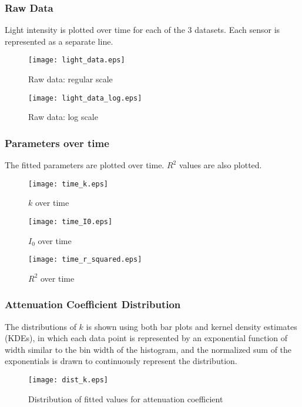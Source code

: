 \subsubsection{Raw Data}

Light intensity is plotted over time for each of the 3 datasets. Each sensor is represented as a separate line.

\begin{figure}[H]
	\centering
	\texttt{[image: light\_data.eps]}
	\caption{Raw data: regular scale}
\end{figure}

\begin{figure}[H]
	\centering
	\texttt{[image: light\_data\_log.eps]}
	\caption{Raw data: log scale}
\end{figure}

\pagebreak
\subsubsection{Parameters over time}
The fitted parameters are plotted over time. $R^2$ values are also plotted.

\begin{figure}[H]
	\centering
	\texttt{[image: time\_k.eps]}
	\caption{$k$ over time}
	\label{time_k}
\end{figure}

\begin{figure}[H]
	\centering
	\texttt{[image: time\_I0.eps]}
	\caption{$I_0$ over time}
	\label{time_I0}
\end{figure}

\begin{figure}[H]
	\centering
	\texttt{[image: time\_r\_squared.eps]}
	\caption{$R^2$ over time}
	\label{time_r_squared}
\end{figure}

\subsubsection{Attenuation Coefficient Distribution}
The distributions of $k$ is shown using both bar plots and kernel density estimates (KDEs), in which each data point is represented by an exponential function of width similar to the bin width of the histogram, and the normalized sum of the exponentials is drawn to continuously represent the distribution.

\begin{figure}[H]
	\centering
	\texttt{[image: dist\_k.eps]}
	\caption{Distribution of fitted values for attenuation coefficient}
\end{figure}

